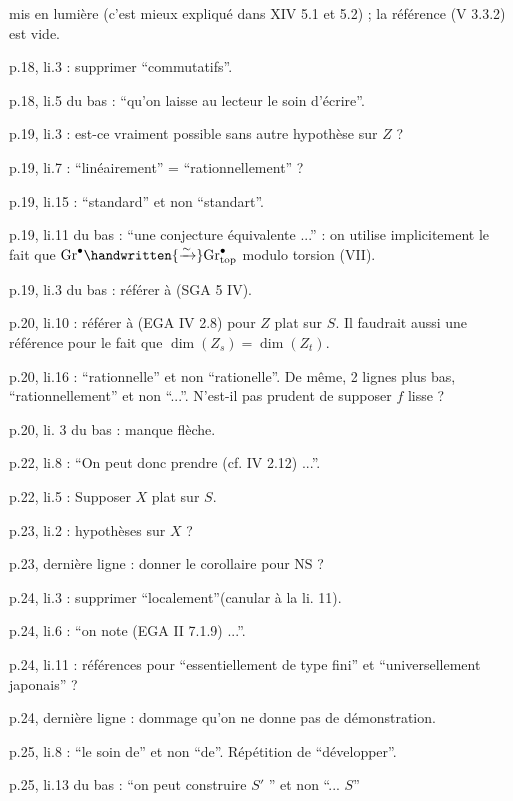  mis en lumière (c'est mieux expliqué dans XIV 5.1 et 5.2) ; la référence (V 3.3.2) est vide.

p.18, li.3 : supprimer ``commutatifs''.

p.18, li.5 du bas : ``qu'on laisse au lecteur le soin d'écrire''.

p.19, li.3 : est-ce vraiment possible sans autre hypothèse sur $Z$ ?

p.19, li.7 : ``linéairement'' = ``rationnellement'' ?

p.19, li.15 : ``standard'' et non ``standart''.

p.19, li.11 du bas : ``une conjecture équivalente ...'' : on utilise implicitement le fait que $\mathrm{Gr}^{\bullet}\handwritten{\xrightarrow{\sim}}\mathrm{Gr}^{\bullet}_{\mathrm{top}}$ modulo torsion (VII\hspace{2em}).

p.19, li.3 du bas : référer à (SGA 5 IV\hspace{2em}).

p.20, li.10 : référer à (EGA IV 2.8) pour $Z$ plat sur $S$. Il faudrait aussi une référence pour le fait que $\dim(Z_s) = \dim(Z_t)$.

p.20, li.16 : ``rationnelle'' et non ``rationelle''. De même, 2 lignes plus bas, ``rationnellement'' et non ``...''. N'est-il pas prudent de supposer $f$ lisse ?

p.20, li. 3 du bas : manque flèche.

p.22, li.8 : ``On peut donc prendre (cf. IV 2.12) ...''.

p.22, li.5 : Supposer $X$ plat sur $S$.

p.23, li.2 : hypothèses sur $X$ ?

p.23, dernière ligne : donner le corollaire pour $\mathrm{NS}$ ?

\margin{\handwritten{---}}
p.24, li.3 : supprimer ``localement''(canular à la li. 11).

p.24, li.6 : ``on note (EGA II 7.1.9) ...''.

p.24, li.11 : références pour ``essentiellement de type fini'' et \unsure{:} ``universellement japonais'' ?

p.24, dernière ligne : dommage qu'on ne donne pas de démonstration.

p.25, li.8 : ``le soin de'' et non ``de''. Répétition  de ``développer''.

p.25, li.13 du bas : ``on peut construire $S'$ '' et non ``... $S$''

